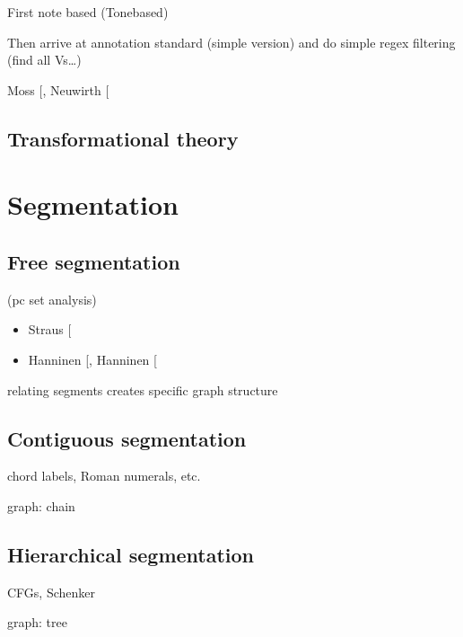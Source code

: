 \documentclass[letterpaper,10pt,english]{sphinxmanual}
\begin{document}
First note based (Tone\sphinxhyphen{}based)

Then arrive at annotation standard (simple version)
and do simple regex filtering (find all Vs…)

Moss  {[}\sphinxcite{8_bibliography:id20}{]}, Neuwirth  {[}\sphinxcite{8_bibliography:id32}{]}


\section{Transformational theory}
\label{\detokenize{4_harmony:transformational-theory}}

\chapter{Segmentation}
\label{\detokenize{5_segmentation:segmentation}}\label{\detokenize{5_segmentation::doc}}

\section{Free segmentation}
\label{\detokenize{5_segmentation:free-segmentation}}
(pc set analysis)
\begin{itemize}
\item {} 
Straus {[}\sphinxcite{8_bibliography:id3}{]}

\item {} 
Hanninen {[}\sphinxcite{8_bibliography:id18}{]}, Hanninen {[}\sphinxcite{8_bibliography:id19}{]}

\end{itemize}

relating segments creates specific graph structure


\section{Contiguous segmentation}
\label{\detokenize{5_segmentation:contiguous-segmentation}}
chord labels, Roman numerals, etc.

graph: chain


\section{Hierarchical segmentation}
\label{\detokenize{5_segmentation:hierarchical-segmentation}}
CFGs, Schenker

graph: tree
\end{document}
